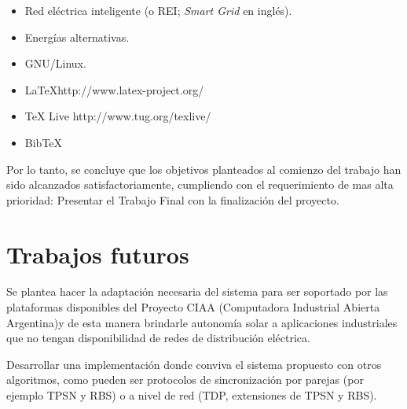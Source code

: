 \begin{itemize}
	\item Red eléctrica inteligente (o REI; \textit{Smart Grid} en inglés).
	\item Energías alternativas.	
	\item GNU/Linux.
	\item \LaTeX http://www.latex-project.org/
	\item TeX Live http://www.tug.org/texlive/
	\item BibTeX
	
\end{itemize}

\medskip

Por lo tanto, se concluye que los objetivos planteados al comienzo del trabajo han sido alcanzados satisfactoriamente, cumpliendo con el requerimiento de mas alta prioridad: Presentar el Trabajo Final con la finalización del proyecto.

\section{Trabajos futuros}

Se plantea hacer la adaptación necesaria del sistema para ser soportado por las plataformas disponibles del Proyecto CIAA \citep{CIAA} (Computadora Industrial Abierta Argentina)y de esta manera brindarle autonomía solar a aplicaciones industriales que no tengan disponibilidad de redes de distribución eléctrica.

Desarrollar una implementación donde conviva el sistema propuesto con otros algoritmos, como pueden ser protocolos de sincronización por parejas (por ejemplo TPSN y RBS) o a nivel de red (TDP, extensiones de TPSN y RBS).








